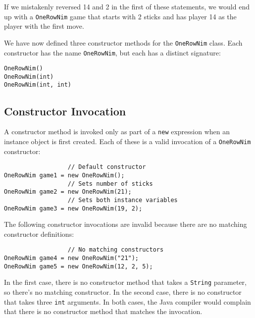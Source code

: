 \noindent  If we mistakenly reversed 14 and 2 in the first
of these statements, we would end up with a {\tt OneRowNim} game that
starts with 2 sticks and has player 14 as the player with the first
move.

We have now defined three constructor methods for the {\tt OneRowNim}
class.  Each constructor has the name {\tt OneRowNim}, but each has a
distinct signature:

\begin{jjjlisting}
\begin{lstlisting}
OneRowNim()
OneRowNim(int)
OneRowNim(int, int)
\end{lstlisting}
\end{jjjlisting}

\subsection{Constructor Invocation}

\noindent A constructor method is invoked only as part of a {\tt new}
expression when an instance object is first created.  Each of
these is a valid invocation of a {\tt OneRowNim} constructor:

\begin{jjjlisting}
\begin{lstlisting}
                  // Default constructor
OneRowNim game1 = new OneRowNim();   
                  // Sets number of sticks
OneRowNim game2 = new OneRowNim(21); 
                  // Sets both instance variables
OneRowNim game3 = new OneRowNim(19, 2); 
\end{lstlisting}
\end{jjjlisting}

The following constructor invocations are invalid because there are no
matching constructor definitions:

\begin{jjjlisting}
\begin{lstlisting}
                  // No matching constructors
OneRowNim game4 = new OneRowNim("21");  
OneRowNim game5 = new OneRowNim(12, 2, 5);
\end{lstlisting}
\end{jjjlisting}

\noindent In the first case, there is no constructor method that takes
a {\tt String} parameter, so there's no matching constructor.  In the
second case, there is no constructor that takes three {\tt int}
arguments.  In both cases, the Java compiler would complain that there
is no constructor method that matches the invocation. 

